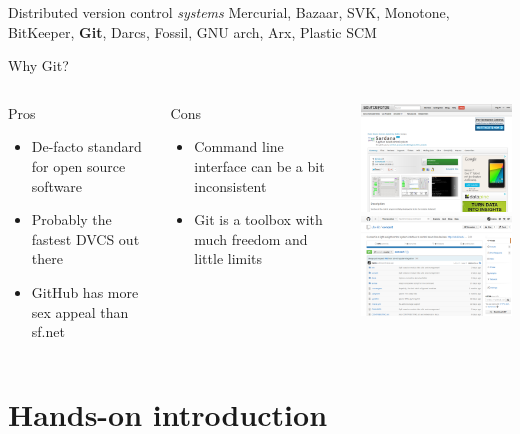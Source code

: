 \documentclass[18pt,mathserif]{beamer}
\begin{document}
\begin{frame}{Distributed version control \emph{systems}}
  Mercurial, Bazaar, SVK, Monotone, BitKeeper, \textbf{Git}, Darcs, Fossil, GNU
  arch, Arx, Plastic SCM
\end{frame}
\begin{frame}{Why Git?}
  \begin{columns}[T,onlytextwidth]
      \begin{block}{Pros}
        \begin{itemize}
          \item De-facto standard for open source software
          \item Probably the fastest DVCS out there
          \item GitHub has more sex appeal than sf.net
        \end{itemize}
      \end{block}

      \begin{block}{Cons}
        \begin{itemize}
          \item Command line interface can be a bit inconsistent
          \item Git is a toolbox with much freedom and little limits
        \end{itemize}
      \end{block}
      \centering
      \includegraphics[width=4.0cm]{images/sf.png}
      \vspace{1em}
      \includegraphics[width=4.0cm]{images/github.png}
  \end{columns}
\end{frame}

\section{Hands-on introduction}
\end{document}
